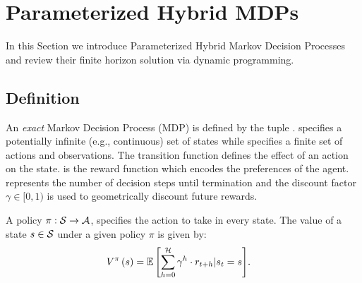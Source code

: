 \section{Parameterized Hybrid MDPs}
\label{sec:hybrid_mdps}

In this Section we introduce Parameterized Hybrid Markov Decision Processes and review their finite horizon solution via dynamic programming.

\subsection{Definition}

An \textit{exact} Markov Decision Process (MDP) \parencite{Bellman_PU_1957} is defined by the tuple {\footnotesize \MDPTuple}. {\footnotesize \State} specifies a potentially infinite (e.g., continuous) set of states while {\footnotesize \Action} specifies a finite set of actions and observations. The transition function {\footnotesize \TransFunc } defines the effect of an action on the state. {\footnotesize \RewardFunc} is the reward function which encodes the preferences of the agent. {\footnotesize \Horizon} represents the number of decision steps until termination and the discount factor {\footnotesize $\gamma \in [0, 1)$} is used to geometrically discount future rewards.

A policy $\pi : \mathcal{S} \rightarrow \mathcal{A}$, specifies the action to take in every state. The value of a state $s \in \mathcal{S}$ under a given policy $\pi$ is given by:
{\footnotesize 
    \abovedisplayskip=0pt
    \belowdisplayskip=0pt
\begin{align}
    \label{eq:mdp_vfunc}
    V^{\pi}\left(s\right) &= {\mathbb{E}\left[{\sum\limits_{h = 0}^{\mathcal{H}} \gamma^h \cdot r_{t + h} | s_t = s}\right]}.
\end{align}
}

